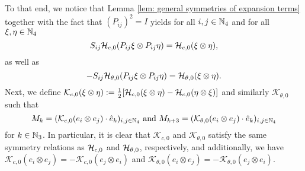 To that end, we notice that Lemma \ref{lem: general symmetries of expansion terms} together with the fact that $(P_{ij})^2 = I$ yields for all $i,j \in \mathbb{N}_4$ and for all $\xi, \eta \in \mathbb{N}_4$
\begin{equation}
	S_{ij} \mathcal{H}_{c,0}(P_{ij} \xi \otimes P_{ij} \eta) = \mathcal{H}_{c,0}(\xi \otimes \eta),
\end{equation}
as well as
\begin{equation}
	-S_{ij} \mathcal{H}_{\theta,0}(P_{ij} \xi \otimes P_{ij} \eta) = \mathcal{H}_{\theta, 0}(\xi \otimes \eta).
\end{equation}
Next, we define $\mathcal{K}_{c,0}(\xi \otimes \eta) := \tfrac{1}{2}[\mathcal{H}_{c,0}(\xi \otimes \eta) - \mathcal{H}_{c,0}(\eta \otimes \xi)]$ and similarly $\mathcal{K}_{\theta,0}$ such that
\begin{equation}
	M_k = (\mathcal{K}_{c,0}(e_i \otimes e_j) \cdot \hat{e}_k)_{i,j \in \mathbb{N}_4} \text{ and } M_{k + 3} = (\mathcal{K}_{\theta,0}(e_i \otimes e_j) \cdot \hat{e}_k)_{i,j \in \mathbb{N}_4}
\end{equation} 
for $k \in \mathbb{N}_3$. In particular, it is clear that $\mathcal{K}_{c,0}$ and $\mathcal{K}_{\theta,0}$ satisfy the same symmetry relations as $\mathcal{H}_{c,0}$ and $\mathcal{H}_{\theta, 0}$, respectively, and additionally, we have $\mathcal{K}_{c,0}(e_i \otimes e_j) = - \mathcal{K}_{c,0}(e_j \otimes e_i)$ and $\mathcal{K}_{\theta,0}(e_i \otimes e_j) = - \mathcal{K}_{\theta,0}(e_j \otimes e_i)$.

